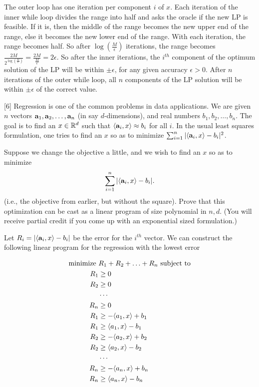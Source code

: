\documentclass[addpoints]{exam}
\begin{document}
\begin{questions}
The outer loop has one iteration per component $i$ of $x$. Each iteration of the inner while loop divides the range into half and asks the oracle if the new LP is feasible. If it is, then the middle of the range becomes the new upper end of the range, else it becomes the new lower end of the range. With each iteration, the range becomes half. So after $\log \left (\frac{M}{\epsilon} \right )$ iterations, the range becomes $\frac{2M}{2^{\log \left (\frac{M}{\epsilon} \right )}} = \frac{2M}{\frac{M}{\epsilon}}=2\epsilon$. So after the inner iterations, the $i^{th}$ component of the optimum solution of the LP will be within $\pm \epsilon$, for any given accuracy $\epsilon > 0$. After $n$ iterations of the outer while loop, all $n$ components of the LP solution will be within $\pm \epsilon$ of the correct value.

[6]
Regression is one of the common problems in data applications.  We are given $n$ vectors $\mathbf{a}_1, \mathbf{a}_2, \dots, \mathbf{a}_n$ (in say $d$-dimensions), and real numbers $b_1, b_2, \dots, b_n$.  The goal is to find an $x \in \mathbb{R}^d$ such that $\langle \mathbf{a}_i, x \rangle \approx b_i$ for all $i$. In the usual least squares formulation, one tries to find an $x$ so as to minimize $\sum_{i=1}^n | \langle \mathbf{a}_i, x \rangle - b_i|^2$.

Suppose we change the objective a little, and we wish to find an $x$ so as to minimize
\[ \sum_{i=1}^n | \langle \mathbf{a}_i, x \rangle - b_i|. \]
(i.e., the objective from earlier, but without the square).  Prove that this optimization can be cast as a linear program of size polynomial in $n, d$.  (You will receive partial credit if you come up with an exponential sized formulation.)

Let $R_i = | \langle \mathbf{a}_i, x \rangle - b_i|$ be the error for the $i^{th}$ vector. We can construct the following linear program for the regression with the lowest error

\begin{align*}
\text{minimize } &R_1+R_2 + \ldots + R_n ~\text{subject to} \\
R_1 &\geq 0\\
R_2 &\geq 0\\
&\cdots \\
R_n &\geq 0\\
R_1 &\geq -\langle a_1, x \rangle +b_1\\
R_1 &\geq \langle a_1, x \rangle -b_1\\
R_2 &\geq -\langle a_2, x \rangle +b_2\\
R_2 &\geq \langle a_2, x \rangle -b_2\\
&\cdots \\
R_n &\geq -\langle a_n, x \rangle +b_n\\
R_n &\geq \langle a_n, x \rangle -b_n\\
\end{align*}


\end{questions}
\end{document}
